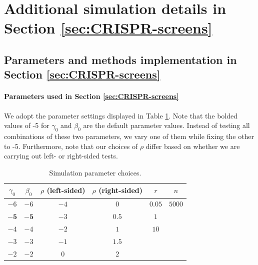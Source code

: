 \documentclass[12pt]{article}
\theoremstyle{definition}
\begin{document}
\section{Additional simulation details in Section \ref{sec:CRISPR-screens}}\label{sec:additional_details_CRISPR}



\subsection{Parameters and methods implementation in Section \ref{sec:CRISPR-screens}}\label{sec:simulation_methods_CRISPR_screens}



\paragraph{Parameters used in Section \ref{sec:CRISPR-screens}}

We adopt the parameter settings displayed in Table \ref{tab:simulation_parameter}. Note that the bolded values of -5 for $\gamma_0$ and $\beta_0$ are the default parameter values. Instead of testing all combinations of these two parameters, we vary one of them while fixing the other to -5. Furthermore, note that our choices of $\rho$ differ based on whether we are carrying out left- or right-sided tests.
\begin{table}[!h]
  \centering
  \begin{tabular}{c|c|c|c|c|c}
  $\gamma_0$ & $\beta_0$ & $\rho$ (left-sided) & $\rho$ (right-sided) & $r$ & $n$ \\
  \hline
  $-6$ & $-6$ & $-4$ & $0$ & $0.05$ & $5000$ \\
  $\bm{-5}$ & $\bm{-5}$ & $-3$ & $0.5$ & $1$ & \\
  $-4$ & $-4$ & $-2$ & $1$ & $10$ & \\
  $-3$ & $-3$ & $-1$ & $1.5$ & & \\
  $-2$ & $-2$ & $0$ & $2$ & & \\
  \end{tabular}
\caption{Simulation parameter choices.}
\label{tab:simulation_parameter}
\end{table}
\end{document}
